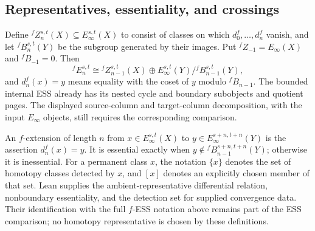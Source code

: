 \subsection{Representatives, essentiality, and crossings}

\begin{definition}
  \label{def:fess-cycles-boundaries}
  \notready
  Define ${}^fZ_n^{s,t}(X)\subseteq E_\infty^{s,t}(X)$ to consist of classes
  on which $d_0^f,\ldots,d_n^f$ vanish, and let
  ${}^fB_n^{s,t}(Y)$ be the subgroup generated by their images.  Put
  ${}^fZ_{-1}=E_\infty(X)$ and ${}^fB_{-1}=0$.  Then
  \[
    {}^fE_n^{s,t}\cong{}^fZ_{n-1}^{s,t}(X)\oplus
      E_\infty^{s,t}(Y)/{}^fB_{n-1}^{s,t}(Y),
  \]
  and $d_n^f(x)=y$ means equality with the coset of $y$ modulo
  ${}^fB_{n-1}$.
  The bounded internal ESS already has its nested cycle and boundary
  subobjects and quotient pages.  The displayed source-column and
  target-column decomposition, with the input $E_\infty$ objects, still
  requires the corresponding comparison.
\end{definition}

\begin{definition}
  \label{def:f-extension-essential}
  \notready
  An $f$-extension of length $n$ from
  $x\in E_\infty^{s,t}(X)$ to
  $y\in E_\infty^{s+n,t+n}(Y)$ is the assertion $d_n^f(x)=y$.
  It is essential exactly when
  $y\notin{}^fB_{n-1}^{s+n,t+n}(Y)$; otherwise it is inessential.  For a
  permanent class $x$, the notation $\{x\}$ denotes the set of homotopy
  classes detected by $x$, and $[x]$ denotes an explicitly chosen member of
  that set.
  Lean supplies the ambient-representative differential relation,
  nonboundary essentiality, and the detection set for supplied convergence
  data.  Their identification with the full $f$-ESS notation above remains
  part of the ESS comparison; no homotopy representative is chosen by these
  definitions.
\end{definition}

